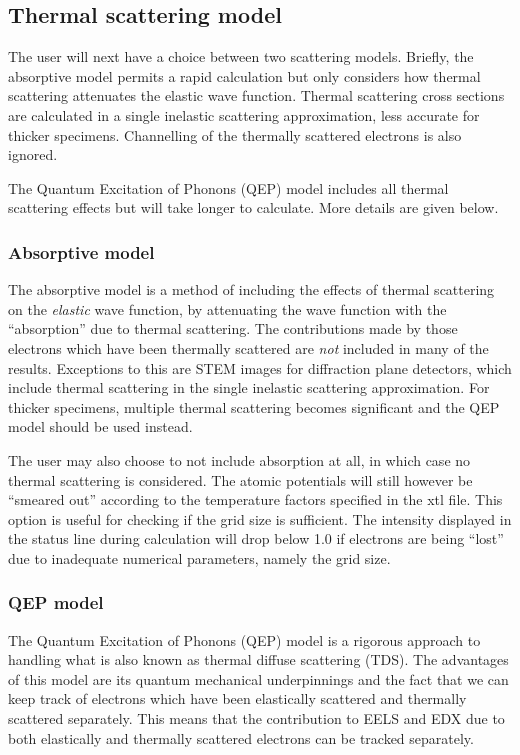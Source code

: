 \documentclass[12pt,a4paper]{article}
\begin{document}
\subsection{Thermal scattering model}

The user will next have a choice between two scattering models.
Briefly, the absorptive model permits a rapid calculation but only considers how thermal scattering attenuates the elastic wave function.
Thermal scattering cross sections are calculated in a single inelastic scattering approximation, less accurate for thicker specimens.
Channelling of the thermally scattered electrons is also ignored.

The Quantum Excitation of Phonons (QEP) model includes all thermal scattering effects but will take longer to calculate.
More details are given below.

\subsubsection{Absorptive model}
\label{sec:absorptive}

The absorptive model is a method of including the effects of thermal scattering on the \emph{elastic} wave function, by attenuating the wave function with the ``absorption'' due to thermal scattering.
The contributions made by those electrons which have been thermally scattered are \emph{not} included in many of the results.
Exceptions to this are STEM images for diffraction plane detectors, which include thermal scattering in the single inelastic scattering approximation.
For thicker specimens, multiple thermal scattering becomes significant and the QEP model should be used instead.

The user may also choose to not include absorption at all, in which case no thermal scattering is considered.
The atomic potentials will still however be ``smeared out'' according to the temperature factors specified in the xtl file.
This option is useful for checking if the grid size is sufficient.
The intensity displayed in the status line during calculation will drop below 1.0 if electrons are being ``lost'' due to inadequate numerical parameters, namely the grid size.


\subsubsection{QEP model}
\label{sec:qep}


The Quantum Excitation of Phonons (QEP) model \cite{Forbes2010} is a rigorous approach to handling what is also known as thermal diffuse scattering (TDS).
The advantages of this model are its quantum mechanical underpinnings and the fact that we can keep track of electrons which have been elastically scattered and thermally scattered separately.
This means that the contribution to EELS and EDX due to both elastically and thermally scattered electrons can be tracked separately.
\end{document}
